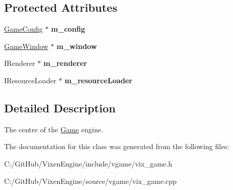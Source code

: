 \subsection*{Protected Attributes}
\begin{DoxyCompactItemize}
\item 
\hypertarget{class_vixen_1_1_game_aa4387adbfcde68a48142de27e21d13d7}{}\hyperlink{class_vixen_1_1_game_config}{Game\+Config} $\ast$ {\bfseries m\+\_\+config}\label{class_vixen_1_1_game_aa4387adbfcde68a48142de27e21d13d7}

\item 
\hypertarget{class_vixen_1_1_game_a70ce88d7a768d448d12cd1dd1a35ec64}{}\hyperlink{class_vixen_1_1_game_window}{Game\+Window} $\ast$ {\bfseries m\+\_\+window}\label{class_vixen_1_1_game_a70ce88d7a768d448d12cd1dd1a35ec64}

\item 
\hypertarget{class_vixen_1_1_game_ac2ef4adaa4442c6afccb8adb8d0b3173}{}I\+Renderer $\ast$ {\bfseries m\+\_\+renderer}\label{class_vixen_1_1_game_ac2ef4adaa4442c6afccb8adb8d0b3173}

\item 
\hypertarget{class_vixen_1_1_game_aff8f829556f6551f37070592573c1d96}{}I\+Resource\+Loader $\ast$ {\bfseries m\+\_\+resource\+Loader}\label{class_vixen_1_1_game_aff8f829556f6551f37070592573c1d96}

\end{DoxyCompactItemize}


\subsection{Detailed Description}
The centre of the \hyperlink{class_vixen_1_1_game}{Game} engine. 

The documentation for this class was generated from the following files\+:\begin{DoxyCompactItemize}
\item 
C\+:/\+Git\+Hub/\+Vixen\+Engine/include/vgame/vix\+\_\+game.\+h\item 
C\+:/\+Git\+Hub/\+Vixen\+Engine/source/vgame/vix\+\_\+game.\+cpp\end{DoxyCompactItemize}
